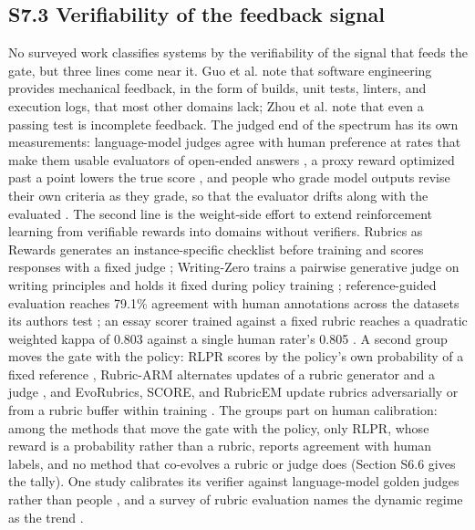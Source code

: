 \documentclass[
]{article}
\begin{document}
\subsection{S7.3 Verifiability of the feedback
signal}\label{s7.3-verifiability-of-the-feedback-signal}

No surveyed work classifies systems by the verifiability of the signal
that feeds the gate, but three lines come near it. Guo et al.
\cite{guo2026harness} note that software engineering provides
mechanical feedback, in the form of builds, unit tests, linters, and
execution logs, that most other domains lack; Zhou et al.
\cite{zhou2026selfevolvingcoding} note that even a passing test is
incomplete feedback. The judged end of the spectrum has its own
measurements: language-model judges agree with human preference at rates
that make them usable evaluators of open-ended answers
\cite{zheng2023judge}, a proxy reward optimized past a point lowers the
true score \cite{gao2023overoptimization}, and people who grade model
outputs revise their own criteria as they grade, so that the evaluator
drifts along with the evaluated \cite{shankar2024validators}. The
second line is the weight-side effort to extend reinforcement learning
from verifiable rewards into domains without verifiers. Rubrics as
Rewards generates an instance-specific checklist before training and
scores responses with a fixed judge \cite{gunjal2025rubrics};
Writing-Zero trains a pairwise generative judge on writing principles
and holds it fixed during policy training \cite{jia2025writingzero};
reference-guided evaluation reaches 79.1\% agreement with human
annotations across the datasets its authors test
\cite{shi2026references}; an essay scorer trained against a fixed
rubric reaches a quadratic weighted kappa of 0.803 against a single
human rater's 0.805 \cite{jin2026rlaes}. A second group moves the gate
with the policy: RLPR scores by the policy's own probability of a fixed
reference \cite{yu2025rlpr}, Rubric-ARM alternates updates of a rubric
generator and a judge \cite{xu2026rubricarm}, and EvoRubrics, SCORE,
and RubricEM update rubrics adversarially or from a rubric buffer within
training \cite{ding2026evorubrics, zhu2026score, li2026rubricem}. The
groups part on human calibration: among the methods that move the gate
with the policy, only RLPR, whose reward is a probability rather than a
rubric, reports agreement with human labels, and no method that
co-evolves a rubric or judge does (Section S6.6 gives the tally). One
study calibrates its verifier against language-model golden judges
rather than people \cite{plesner2026cheapverifier}, and a survey of
rubric evaluation names the dynamic regime as the trend
\cite{chen2026rubricsurvey}.
\end{document}
